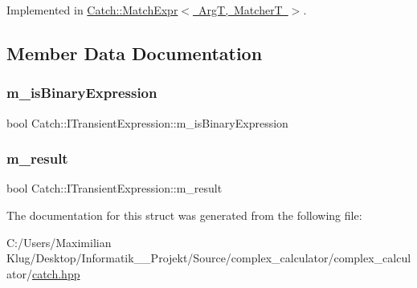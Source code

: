 Implemented in \mbox{\hyperlink{class_catch_1_1_match_expr_ad3e41adb597750b2219bb37e51185629}{Catch\+::\+Match\+Expr$<$ Arg\+T, Matcher\+T $>$}}.



\subsection{Member Data Documentation}
\mbox{\label{struct_catch_1_1_i_transient_expression_a75ce48da824d514d08152d396abb28d8}} 
\subsubsection{\texorpdfstring{m\+\_\+is\+Binary\+Expression}{m\_isBinaryExpression}}
{\footnotesize\ttfamily bool Catch\+::\+I\+Transient\+Expression\+::m\+\_\+is\+Binary\+Expression}

\mbox{\label{struct_catch_1_1_i_transient_expression_a4646e2b5e0156e913653ec3b9b60c942}} 
\subsubsection{\texorpdfstring{m\+\_\+result}{m\_result}}
{\footnotesize\ttfamily bool Catch\+::\+I\+Transient\+Expression\+::m\+\_\+result}



The documentation for this struct was generated from the following file\+:\begin{DoxyCompactItemize}
\item 
C\+:/\+Users/\+Maximilian Klug/\+Desktop/\+Informatik\+\_\+\_\+\+Projekt/\+Source/complex\+\_\+calculator/complex\+\_\+calculator/\mbox{\hyperlink{catch_8hpp}{catch.\+hpp}}\end{DoxyCompactItemize}
